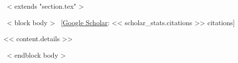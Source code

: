 ~< extends "section.tex" >~

~< block body >~
\vspace{-8.2mm}\hspace{30mm}[\href{https://scholar.google.com/citations?user=<< scholar_id >>}{Google Scholar}: << scholar_stats.citations >> citations]\vspace{3mm}





<< content.details >>

~< endblock body >~
